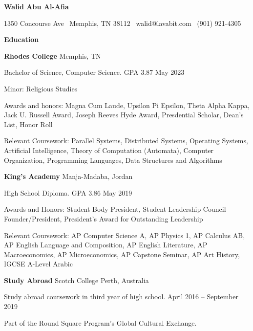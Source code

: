 \documentclass[11pt]{article}
\begin{document}
\begin{center}
    \textbf{Walid Abu Al-Afia}\\ 
    \hrulefill
\end{center}

\begin{center}
    1350 Concourse Ave \textbullet \ Memphis, TN 38112 \textbullet \ walid@lavabit.com \textbullet \ (901) 921-4305
\end{center}

\vspace{0.5pt}

\begin{center}
    \textbf{Education}
\end{center}
\textbf{Rhodes College} \hfill Memphis, TN

Bachelor of Science, Computer Science. GPA 3.87 \hfill May 2023

Minor: Religious Studies

Awards and honors: Magna Cum Laude, Upsilon Pi Epsilon, Theta Alpha Kappa, Jack U. Russell Award, Joseph Reeves Hyde Award, Presdential Scholar, Dean's List, Honor Roll

Relevant Coursework: Parallel Systems, Distributed Systems, Operating Systems, Artificial Intelligence, Theory of Computation (Automata), Computer Organization, Programming Languages, Data Structures and Algorithms

\vspace{12pt}

\textbf{King's Academy} \hfill	Manja-Madaba, Jordan

High School Diploma. GPA 3.86 \hfill May 2019

Awards and Honors: Student Body President, Student Leadership Council Founder/President, President's Award for Outstanding Leadership

Relevant Coursework: AP Computer Science A, AP Physics 1, AP Calculus AB, AP English Language and Composition, AP English Literature, AP Macroeconomics, AP Microeconomics, AP Capstone Seminar, AP Art History, IGCSE A-Level Arabic

\vspace{12pt}

\textbf{Study Abroad} Scotch College \hfill Perth, Australia

Study abroad coursework in third year of high school. \hfill April 2016 – September 2019

Part of the Round Square Program's Global Cultural Exchange.
\vspace{12pt}
\end{document}
